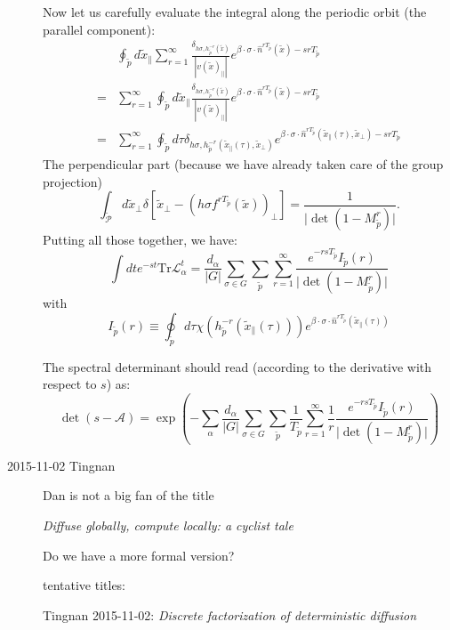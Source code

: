 \begin{description}
Now let us carefully evaluate the integral along the periodic orbit
(the parallel component):
\begin{align*}
 & \oint_{\tilde{p}}d\tilde{x}_{\parallel}\sum_{r=1}^{\infty}\frac{\delta_{h\sigma,h_{\tilde{p}}^{-r}(\tilde{x})}}{\left|v(\tilde{x})_{\parallel}\right|}e^{\beta\cdot\sigma\cdot\hat{n}^{rT_{\tilde{p}}}(\tilde{x})-srT_{\tilde{p}}}\\
= & \sum_{r=1}^{\infty}\oint_{\tilde{p}}d\tilde{x}_{\parallel}\frac{\delta_{h\sigma,h_{\tilde{p}}^{-r}(\tilde{x})}}{\left|v(\tilde{x})_{\parallel}\right|}e^{\beta\cdot\sigma\cdot\hat{n}^{rT_{\tilde{p}}}(\tilde{x})-srT_{\tilde{p}}}\\
= & \sum_{r=1}^{\infty}\oint_{\tilde{p}}d\tau\delta_{h\sigma,h_{\tilde{p}}^{-r}(\tilde{x}_{\parallel}(\tau),\tilde{x}_{\perp})}e^{\beta\cdot\sigma\cdot\hat{n}^{rT_{\tilde{p}}}(\tilde{x}_{\parallel}(\tau),\tilde{x}_{\perp})-srT_{\tilde{p}}}
\end{align*}
The perpendicular part (because we have already taken care of the
group projection)
\[
\int_{\tilde{\mathcal{P}}}d\tilde{x}_{\perp}\delta\left[\tilde{x}_{\perp}-\left(h\sigma f^{rT_{\tilde{p}}}(\tilde{x})\right)_{\perp}\right]=\frac{1}{\vert\det(1-M_{\tilde{p}}^{r})\vert}.
\]
 Putting all those together, we have:
\[
\int dte^{-st}\mathrm{Tr}\mathcal{L}_{\alpha}^{t}=\frac{d_{\alpha}}{\vert G\vert}\sum_{\sigma\in G}\sum_{\tilde{p}}\sum_{r=1}^{\infty}\frac{e^{-rsT_{\tilde{p}}}I_{\tilde{p}}(r)}{\vert\det(1-M_{\tilde{p}}^{r})\vert}
\]
with
\[
I_{\tilde{p}}(r)\equiv\oint_{\tilde{p}}d\tau \chi( h_{\tilde{p}}^{-r}(\tilde{x}_{\parallel}(\tau)))e^{\beta\cdot\sigma\cdot\hat{n}^{rT_{\tilde{p}}}(\tilde{x}_{\parallel}(\tau))}
\]


The spectral determinant should read (according to the derivative
with respect to $s$) as:
\[
\det(s-\mathcal{A})=\exp\left(-\sum_{\alpha}\frac{d_{\alpha}}{\vert G\vert}\sum_{\sigma\in G}\sum_{\tilde{p}}\frac{1}{T_{\tilde{p}}}\sum_{r=1}^{\infty}\frac{1}{r}\frac{e^{-rsT_{\tilde{p}}}I_{\tilde{p}}(r)}{\vert\det(1-M_{\tilde{p}}^{r})\vert}\right)
\]

                                        \toCB
\item[2015-11-02 Tingnan]
Dan is not a big fan of the title

{\em Diffuse globally, compute locally: a cyclist tale}

 Do we have a more formal version?

 tentative titles:

Tingnan 2015-11-02: {\em Discrete factorization of deterministic diffusion}


\end{description}
